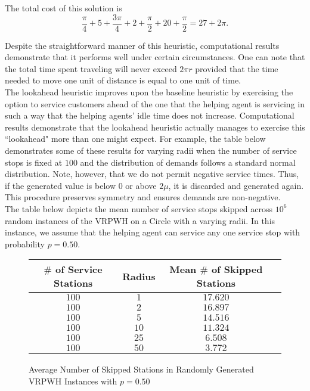 \documentclass[12pt]{scrartcl}
\begin{document}
\noindent The total cost of this solution is 
\[
\frac{\pi}{4} + 5 + \frac{3\pi}{4} + 2 + \frac{\pi}{2} + 20 + \frac{\pi}{2} = 27 + 2\pi. 
\]

Despite the straightforward manner of this heuristic, computational results demonstrate that it performs well under certain circumstances. One can note that the total time spent traveling will never exceed $2\pi r$ provided that the time needed to move one unit of distance is equal to one unit of time. \\

The lookahead heuristic improves upon the baseline heuristic by exercising the option to service customers ahead of the one that the helping agent is servicing in such a way that the helping agents' idle time does not increase. Computational results demonstrate that the lookahead heuristic actually manages to exercise this ``lookahead" more than one might expect. For example, the table below demonstrates some of these results for varying radii when the number of service stops is fixed at $100$ and the distribution of demands follows a standard normal distribution. Note, however, that we do not permit negative service times. Thus, if the generated value is below $0$ or above $2\mu$, it is discarded and generated again. This procedure preserves symmetry and ensures demands are non-negative. \\

\noindent The table below depicts the mean number of service stops skipped across $10^{6}$ random instances of the VRPWH on a Circle with a varying radii. In this instance, we assume that the helping agent can service any one service stop with probability $p = 0.50$.


\renewcommand{\figurename}{Table}
\begin{figure}[H]
\centering
\begin{tabular}{ |c|c|c||c| } 
 \hline
 $\#$ of Service Stations & Radius & Mean $\#$ of Skipped Stations \\
 \hline
 $100$ & $1$ & $17.620$ \\ 
 \hline
 $100$ & $2$ & $16.897$ \\ 
 \hline
 $100$ & $5$ & $14.516$ \\
 \hline
 $100$ & $10$ & $11.324$ \\
 \hline
 $100$ & $25$ & $6.508$ \\
 \hline
 $100$ & $50$ & $3.772$ \\
 \hline
\end{tabular}
\caption{Average Number of Skipped Stations in Randomly Generated VRPWH Instances with $p = 0.50$}
\end{figure}
\end{document}
